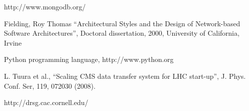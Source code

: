 \documentclass[1p,times]{elsarticle}
\begin{document}
\begin{thebibliography}{00}
http://www.mongodb.org/

Fielding, Roy Thomas ``Architectural Styles and the Design of 
Network-based Software Architectures'', Doctoral dissertation, 2000,
University of California, Irvine

 Python programming language, http://www.python.org

L. Tuura et al., 
``Scaling CMS data transfer system for LHC start-up'', 
J. Phys. Conf. Ser, 119, 072030 (2008).









http://drsg.cac.cornell.edu/
\end{thebibliography}
\end{document}
